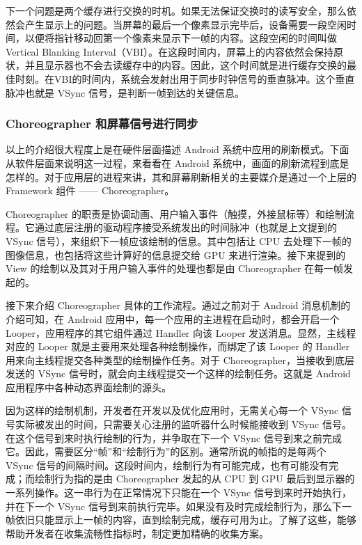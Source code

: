 下一个问题是两个缓存进行交换的时机。如果无法保证交换时的读写安全，那么依然会产生显示上的问题。当屏幕的最后一个像素显示完毕后，设备需要一段空闲时间，以便将指针移动回第一个像素来显示下一帧的内容。这段空闲的时间叫做 Vertical Blanking Interval（VBI）\cite{anderson1971vertical}。在这段时间内，屏幕上的内容依然会保持原状，并且显示器也不会去读缓存中的内容。因此，这个时间就是进行缓存交换的最佳时刻。在VBI的时间内，系统会发射出用于同步时钟信号的垂直脉冲。这个垂直脉冲也就是 VSync 信号，是判断一帧到达的关键信息。

\subsubsection*{Choreographer 和屏幕信号进行同步}

以上的介绍很大程度上是在硬件层面描述 Android 系统中应用的刷新模式。下面从软件层面来说明这一过程，来看看在 Android 系统中，画面的刷新流程到底是怎样的。对于应用层的进程来讲，其和屏幕刷新相关的主要媒介是通过一个上层的 Framework 组件 —— Choreographer。

Choreographer 的职责是协调动画、用户输入事件（触摸，外接鼠标等）和绘制流程。它通过底层注册的驱动程序接受系统发出的时间脉冲（也就是上文提到的 VSync 信号），来组织下一帧应该绘制的信息。其中包括让 CPU 去处理下一帧的图像信息，也包括将这些计算好的信息提交给 GPU 来进行渲染。接下来提到的 View 的绘制以及其对于用户输入事件的处理也都是由 Choreographer 在每一帧发起的。

接下来介绍 Choreographer 具体的工作流程。通过之前对于 Android 消息机制的介绍可知，在 Android 应用中，每一个应用的主进程在启动时，都会开启一个 Looper，应用程序的其它组件通过 Handler 向该 Looper 发送消息。显然，主线程对应的 Looper 就是主要用来处理各种绘制操作，而绑定了该 Looper 的 Handler 用来向主线程提交各种类型的绘制操作任务。对于 Choreographer，当接收到底层发送的 VSync 信号时，就会向主线程提交一个这样的绘制任务。这就是 Android 应用程序中各种动态界面绘制的源头。


因为这样的绘制机制，开发者在开发以及优化应用时，无需关心每一个 VSync 信号实际被发出的时间，只需要关心注册的监听器什么时候能接收到 VSync 信号。在这个信号到来时执行绘制的行为，并争取在下一个 VSync 信号到来之前完成它。因此，需要区分“帧”和“绘制行为”的区别。通常所说的帧指的是每两个 VSync 信号的间隔时间。这段时间内，绘制行为有可能完成，也有可能没有完成；而绘制行为指的是由 Choreographer 发起的从 CPU 到 GPU 最后到显示器的一系列操作。这一串行为在正常情况下只能在一个 VSync 信号到来时开始执行，并在下一个 VSync 信号到来前执行完毕。如果没有及时完成绘制行为，那么下一帧依旧只能显示上一帧的内容，直到绘制完成，缓存可用为止。了解了这些，能够帮助开发者在收集流畅性指标时，制定更加精确的收集方案。


